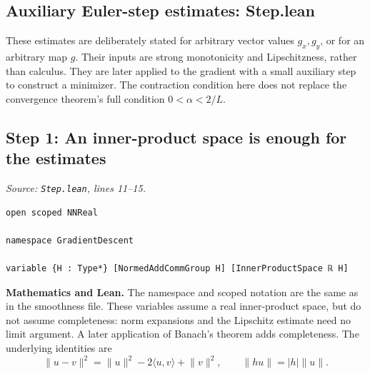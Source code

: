 \documentclass[11pt,a4paper]{article}
\newcommand{\ip}[2]{\langle #1,#2\rangle}
\newcommand{\norm}[1]{\lVert #1\rVert}
\newcommand{\lean}[1]{\ifmmode\text{\nolinkurl{#1}}\else\nolinkurl{#1}\fi}
\newenvironment{proofstep}{%
 \begin{lrbox}{\proofstepbox}\begin{minipage}{\linewidth}%
}{%
 \end{minipage}\end{lrbox}%
 \par\Needspace{\dimexpr\ht\proofstepbox+\dp\proofstepbox+8pt\relax}%
 \noindent\usebox{\proofstepbox}\par\medskip%
}
\begin{document}
\begin{proofstep}

\section{Auxiliary Euler-step estimates: Step.lean}

These estimates are deliberately stated for arbitrary vector values $g_x,g_y$, or for an arbitrary map $g$. Their inputs are strong monotonicity and Lipschitzness, rather than calculus. They are later applied to the gradient with a small auxiliary step to construct a minimizer. The contraction condition here does not replace the convergence theorem's full condition $0<\alpha<2/L$.

\subsection*{Step 1: An inner-product space is enough for the estimates}

\textit{Source: \lean{Step.lean}, lines 11--15.}
\begin{lstlisting}[style=leanproof,firstnumber=11]
open scoped NNReal

namespace GradientDescent

variable {H : Type*} [NormedAddCommGroup H] [InnerProductSpace ℝ H]
\end{lstlisting}


\textbf{Mathematics and Lean.} The namespace and scoped notation are the same as in the smoothness file. These variables assume a real inner-product space, but do not assume completeness: norm expansions and the Lipschitz estimate need no limit argument. A later application of Banach's theorem adds completeness. The underlying identities are
\[\norm{u-v}^{2}=\norm u^2-2\ip{u}{v}+\norm v^2,
 \qquad \norm{hu}=|h|\norm u.\]

\end{proofstep}
\end{document}
